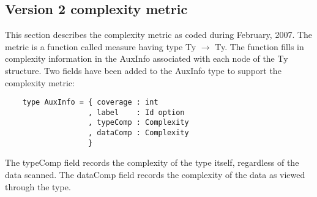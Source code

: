 \subsection{Version 2 complexity metric}

This section describes the complexity metric as coded during February,
2007. The metric is a function called \textsf{measure} having type
\textsf{Ty} $\rightarrow$ \textsf{Ty}. The function fills in complexity
information in the \textsf{AuxInfo} associated with each node of the
\textsf{Ty} structure. Two fields have been added to the \textsf{AuxInfo} type
to support the complexity metric:

\begin{verbatim}
    type AuxInfo = { coverage : int
                   , label    : Id option
                   , typeComp : Complexity
                   , dataComp : Complexity
                   }
\end{verbatim}

The \textsf{typeComp} field records the complexity of the type itself,
regardless of the data scanned. The \textsf{dataComp} field records
the complexity of the data as viewed through the type.

